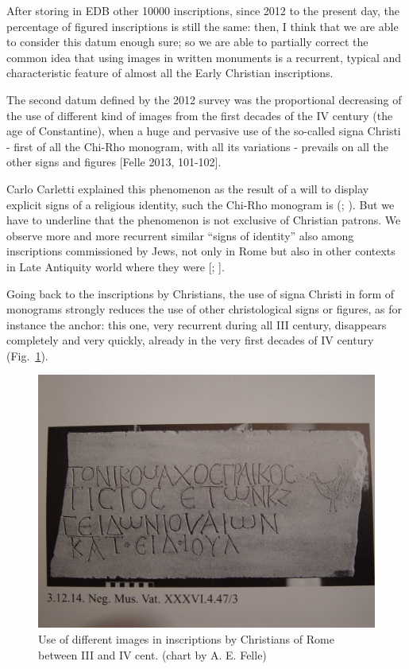 \documentclass[amsthm,ebook]{saparticle}
\begin{document}
After storing in EDB other 10000 inscriptions, since 2012 to the present day, the percentage of figured inscriptions is
still the same: then, I think that we are able to consider this datum enough sure; so we are able to partially correct
the common idea that using images in written monuments is a recurrent, typical and characteristic feature of almost all
the Early Christian inscriptions.

The second datum defined by the 2012 survey was the proportional decreasing of the use of different kind of images from
the first decades of the IV century (the age of Constantine), when a huge and pervasive use of the so-called signa
Christi - first of all the Chi-Rho monogram, with all its variations - prevails on all the other signs and figures
[Felle 2013, 101-102].

Carlo Carletti explained this phenomenon as the result of a will to display explicit signs of a religious identity, such
the Chi-Rho monogram is (\citet[68-72]{carletti_epigrafia_2008}; \citet[365-366]{felle_judaism_2007}). But we have to underline that the phenomenon is
not exclusive of Christian patrons. We observe more and more recurrent similar ``signs of
identity'' also among inscriptions commissioned by Jews, not only in Rome but also in other contexts in
Late Antiquity world where they were [\citet[passim]{felle_judaism_2007}; \citet{pesce_documenti_2016}].

Going back to the inscriptions by Christians, the use of signa Christi in form of monograms strongly reduces the use
of other christological signs or figures, as for instance the anchor: this one, very recurrent during all III
century, disappears completely and very quickly, already in the very first decades of IV century \citep[103]{felle_apporto_2013}
(Fig.~\ref{fig:2}). %




\begin{figure}[!bp]
\centering
 \includegraphics[width=\columnwidth]{FelleVisualFeaturesofinscriptionsEAGLE2016FullPaper-img002.jpg}
\caption{Use of different images in inscriptions by Christians of Rome between III and IV cent. (chart by A. E. Felle)}
\label{fig:2}
\end{figure}
 
\end{document}
